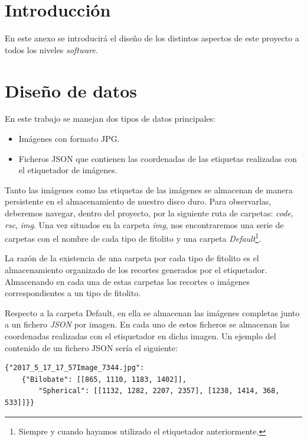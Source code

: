 
\section{Introducción}

En este anexo se introducirá el diseño de los distintos aspectos de este proyecto a todos los niveles \textit{software}.

\section{Diseño de datos}

En este trabajo se manejan dos tipos de datos principales:

\begin{itemize}
	\item Imágenes con formato JPG.
	\item Ficheros JSON que contienen las coordenadas de las etiquetas realizadas con el etiquetador de imágenes.
\end{itemize}

Tanto las imágenes como las etiquetas de las imágenes se almacenan de manera persistente en el almacenamiento de nuestro disco duro. Para observarlas, deberemos navegar, dentro del proyecto, por la siguiente ruta de carpetas: \textit{code}, \textit{rsc}, \textit{img}. Una vez situados en la carpeta \textit{img}, nos encontraremos una serie de carpetas con el nombre de cada tipo de fitolito y una carpeta \textit{Default}\footnote{Siempre y cuando hayamos utilizado el etiquetador anteriormente.}.

La razón de la existencia de una carpeta por cada tipo de fitolito es el almacenamiento organizado de los recortes generados por el etiquetador. Almacenando en cada una de estas carpetas los recortes o imágenes correspondientes a un tipo de fitolito. 

Respecto a la carpeta Default, en ella se almacenan las imágenes completas junto a un fichero \textit{JSON} por imagen. En cada uno de estos ficheros se almacenan las coordenadas  realizadas con el etiquetador en dicha imagen. Un ejemplo del contenido de un fichero JSON sería el siguiente:

\begin{verbatim}
{"2017_5_17_17_57Image_7344.jpg": 
	{"Bilobate": [[865, 1110, 1183, 1402]], 
		"Spherical": [[1132, 1282, 2207, 2357], [1238, 1414, 368, 533]]}}
\end{verbatim}

